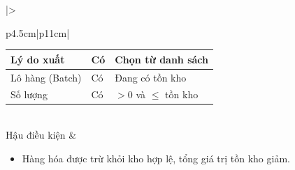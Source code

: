 \documentclass[12pt,a4paper]{report}
\begin{document}
\begin{longtable}{|>{\raggedright\arraybackslash\bfseries}p{4.5cm}|p{11cm}|}
\begin{tabular}{|p{3.5cm}|p{2.5cm}|p{4cm}|}
Lý do xuất & Có & Chọn từ danh sách \\ \hline
Lô hàng (Batch) & Có & Đang có tồn kho \\ \hline
Số lượng & Có & $> 0$ và $\le$ tồn kho \\ \hline
\end{tabular} \\ \hline
Hậu điều kiện & 
\begin{itemize}[leftmargin=*, nosep, topsep=0pt, partopsep=0pt]
    \item Hàng hóa được trừ khỏi kho hợp lệ, tổng giá trị tồn kho giảm.
\end{itemize} \\ \hline
\end{longtable}

\vspace{0.5cm}
\end{document}
